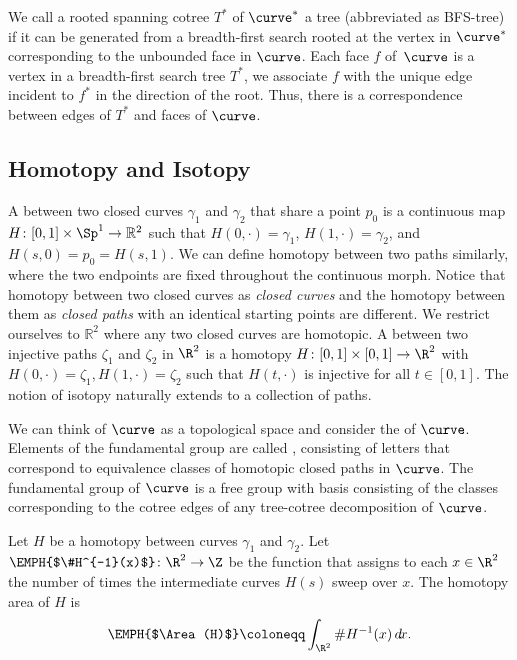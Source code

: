 We call a rooted spanning cotree $T^*$ of $\curve^*$ a  tree 
(abbreviated as BFS-tree) if it can be generated from a breadth-first search rooted at the 
vertex in $\curve^*$ corresponding to the unbounded face in $\curve$.
Each face $f$ of~$\curve$ is a vertex in a breadth-first search tree $T^*$, we associate $f$ 
with the unique edge incident to $f^*$ in the direction of the root.
Thus, there is a correspondence between edges of $T^*$ and faces of $\curve$.


\subsection{Homotopy and Isotopy}

A  between two closed curves $\gamma_1$ and $\gamma_2$ that 
share a point $p_0$ is a continuous map $H\colon [0,1]\times \Sp^1 \to \mathbb{R}^2$ 
such that $H(0,\cdot)=\gamma_1$, $H(1,\cdot)=\gamma_2$, and $H(s,0)=p_0=H(s,1)$.
We can define homotopy between two paths similarly, where the two endpoints are fixed
 throughout the continuous morph.
Notice that homotopy between two closed curves as \emph{closed curves} and the 
homotopy between them as \emph{closed paths} with an identical starting points are different.
We restrict ourselves to $\mathbb{R}^2$ where any two closed curves are homotopic.
%
A  between two injective paths $\zeta_1$ and $\zeta_2$ in $\R^2$ is
a homotopy $H\colon [0,1]\times [0,1] \to \R^2$ with $H(0,\cdot)=\zeta_1,
 H(1,\cdot)=\zeta_2$ such that $H(t,\cdot)$ is injective for all $t\in[0,1]$.
The notion of isotopy naturally extends to a collection of paths.

We can think of $\curve$ as a topological space and consider the  of $\curve$.
Elements of the fundamental group are called , consisting of letters that 
correspond to equivalence classes of homotopic closed paths in $\curve$.
The fundamental group of $\curve$ is a free group with basis consisting of the classes 
corresponding to the cotree edges of any tree-cotree decomposition of $\curve$.




 Let $H$ be a homotopy between curves $\gamma_1$ and $\gamma_2$.
 Let $\EMPH{$\#H^{-1}(x)$} \colon \R^2 \to \Z$ be the function that assigns to each $x\in\R^2$ 
 the number of times the intermediate curves $H(s)$ sweep over $x$.
 The homotopy area of $H$ is
 \[
     \EMPH{$\Area(H)$} \coloneqq \int_{\R^2} \#H^{-1}(x) \, d\!x.
 \]

